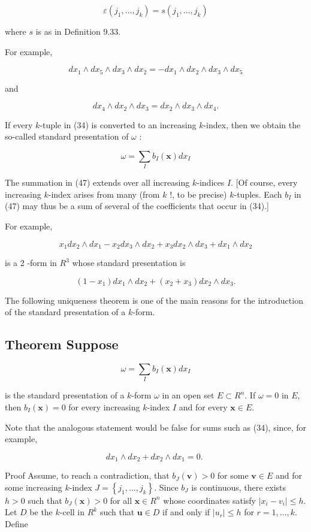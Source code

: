 \documentclass[10pt]{article}
\begin{document}
$$
\varepsilon\left(j_{1}, \ldots, j_{k}\right)=s\left(j_{1}, \ldots, j_{k}\right)
$$

where $s$ is as in Definition 9.33.

For example,

$$
d x_{1} \wedge d x_{5} \wedge d x_{3} \wedge d x_{2}=-d x_{1} \wedge d x_{2} \wedge d x_{3} \wedge d x_{5}
$$

and

$$
d x_{4} \wedge d x_{2} \wedge d x_{3}=d x_{2} \wedge d x_{3} \wedge d x_{4} .
$$

If every $k$-tuple in (34) is converted to an increasing $k$-index, then we obtain the so-called standard presentation of $\omega$ :

$$
\omega=\sum_{I} b_{I}(\mathbf{x}) d x_{I}
$$

The summation in (47) extends over all increasing $k$-indices $I$. [Of course, every increasing $k$-index arises from many (from $k$ !, to be precise) $k$-tuples. Each $b_{I}$ in (47) may thus be a sum of several of the coefficients that occur in (34).]

For example,

$$
x_{1} d x_{2} \wedge d x_{1}-x_{2} d x_{3} \wedge d x_{2}+x_{3} d x_{2} \wedge d x_{3}+d x_{1} \wedge d x_{2}
$$

is a 2 -form in $R^{3}$ whose standard presentation is

$$
\left(1-x_{1}\right) d x_{1} \wedge d x_{2}+\left(x_{2}+x_{3}\right) d x_{2} \wedge d x_{3} .
$$

The following uniqueness theorem is one of the main reasons for the introduction of the standard presentation of a $k$-form.

\subsection{Theorem Suppose}
$$
\omega=\sum_{I} b_{I}(\mathbf{x}) d x_{I}
$$

is the standard presentation of a $k$-form $\omega$ in an open set $E \subset R^{n}$. If $\omega=0$ in $E$, then $b_{I}(\mathbf{x})=0$ for every increasing $k$-index $I$ and for every $\mathbf{x} \in E$.

Note that the analogous statement would be false for sums such as (34), since, for example,

$$
d x_{1} \wedge d x_{2}+d x_{2} \wedge d x_{1}=0 \text {. }
$$

Proof Assume, to reach a contradiction, that $b_{J}(\mathbf{v})>0$ for some $\mathbf{v} \in E$ and for some increasing $k$-index $J=\left\{j_{1}, \ldots, j_{k}\right\}$. Since $b_{J}$ is continuous, there exists $h>0$ such that $b_{J}(\mathbf{x})>0$ for all $\mathbf{x} \in R^{n}$ whose coordinates satisfy $\left|x_{i}-v_{i}\right| \leq h$. Let $D$ be the $k$-cell in $R^{k}$ such that $\mathbf{u} \in D$ if and only if $\left|u_{r}\right| \leq h$ for $r=1, \ldots, k$. Define
\end{document}
